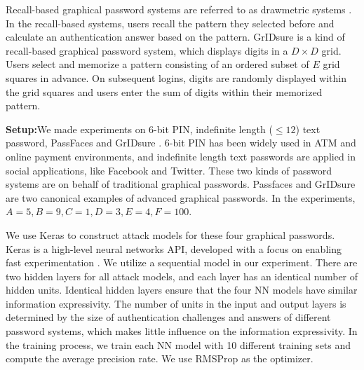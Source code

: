 \documentclass{article}
\begin{document}
  Recall-based graphical password systems are referred to as drawmetric systems \cite{DBLP:journals/ijmms/AngeliCJR05}. 
  In the recall-based systems, users recall the pattern they selected before and calculate an authentication 
  answer based on the pattern. GrIDsure is a kind of recall-based graphical password system, which displays digits in a $D \times D$ grid. 
  Users select and memorize a pattern consisting of an ordered subset of $E$ grid squares in advance. On 
  subsequent logins, digits are randomly displayed within the grid squares and users enter the sum of digits 
  within their memorized pattern.
  
  \textbf{Setup:}We made experiments on $6$-bit PIN, indefinite length ($\leq 12$) 
  text password, PassFaces and GrIDsure \cite{Brostoff2010Evaluating}. $6$-bit PIN has been 
  widely used in ATM and online payment environments, and indefinite length text passwords are applied in social 
  applications, like Facebook and Twitter. These two kinds of password systems are on behalf of traditional 
  graphical passwords. Passfaces and GrIDsure are two canonical examples of advanced graphical passwords. In the 
  experiments, $A = 5, B = 9, C = 1, D = 3, E = 4, F=100$.
  
  We use Keras to construct attack models for these four graphical passwords. Keras is a high-level neural networks 
  API, developed with a focus on enabling fast experimentation \cite{chollet2015keras}. We utilize a sequential model in our experiment. 
  There are two hidden layers for all attack models, and each layer has an identical number of hidden units. Identical hidden layers ensure 
  that the four NN models have similar information expressivity. The number of units in the input and output 
  layers is determined by the size of authentication challenges and answers of different password systems, 
  which makes little influence on the information expressivity. In the training process, we train each NN model with 
  10 different training sets and compute the average precision rate. We use RMSProp as the optimizer.
  
\end{document}
